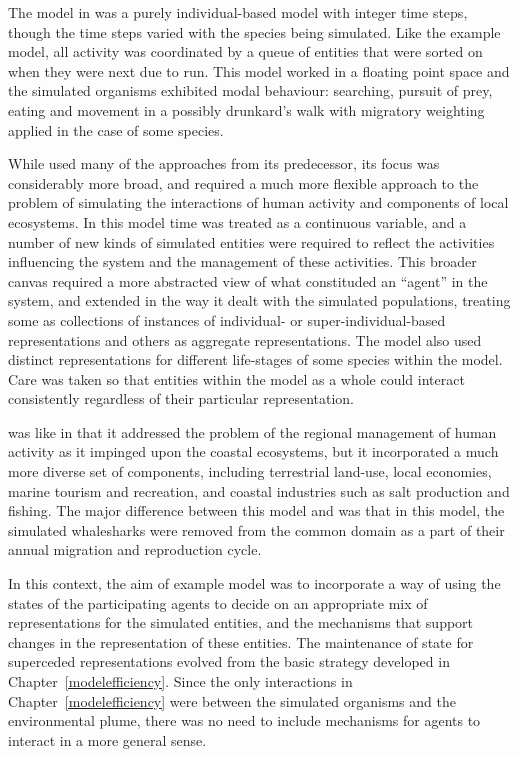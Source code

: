 The model in \cite{lyne1994pmez5} was a purely individual-based model
with integer time steps, though the time steps varied with the species
being simulated. Like the example model, all activity was coordinated
by a queue of entities that were sorted on when they were next due to
run. This model worked in a floating point space and the simulated
organisms exhibited modal behaviour: searching, pursuit of prey,
eating and movement in a possibly drunkard's walk with migratory
weighting applied in the case of some species.

While \cite{gray2006nws} used many of the approaches from its
predecessor, its focus was considerably more broad, and required a
much more flexible approach to the problem of simulating the
interactions of human activity and components of local ecosystems. In
this model time was treated as a continuous variable, and a number of
new kinds of simulated entities were required to reflect the
activities influencing the system and the management of these
activities. This broader canvas required a more abstracted view of
what constituded an ``agent'' in the system, and extended
\cite{lyne1994pmez5} in the way it dealt with the simulated
populations, treating some as collections of instances of individual-
or super-individual-based representations and others as aggregate
representations.  The model also used distinct representations for
different life-stages of some species within the model.  Care was
taken so that entities within the model as a whole could interact
consistently regardless of their particular representation.

\cite{gray2014} was like \cite{gray2006nws} in that it addressed the
problem of the regional management of human activity as it impinged
upon the coastal ecosystems, but it incorporated a much more diverse
set of components, including terrestrial land-use, local economies,
marine tourism and recreation, and coastal industries such as salt
production and fishing. The major difference between this model and
\cite{gray2006nws} was that in this model, the simulated whalesharks were
removed from the common domain as a part of their annual migration and
reproduction cycle. 

In this context, the aim of example model was to incorporate a way of
using the states of the participating agents to decide on an
appropriate mix of representations for the simulated entities, and the
mechanisms that support changes in the representation of these
entities. The maintenance of state for superceded representations
evolved from the basic strategy developed in
Chapter~\ref{modelefficiency}.  Since the only interactions in
Chapter~\ref{modelefficiency} were between the simulated organisms and
the environmental plume, there was no need to include mechanisms for
agents to interact in a more general sense.

